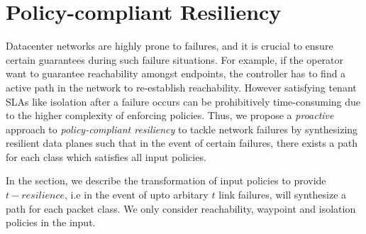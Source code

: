 \section{Policy-compliant Resiliency}
Datacenter networks are highly prone to failures, 
and it is crucial to ensure certain guarantees during such failure
situations. For example, if the operator want to guarantee
reachability amongst endpoints, the controller has to find a active
path in the network to re-establish reachability. However
satisfying tenant SLAs like isolation after a failure occurs
can be prohibitively time-consuming due to the higher complexity
of enforcing policies. 
Thus, we propose a \emph{proactive} approach 
to \emph{policy-compliant resiliency} to tackle network failures
by synthesizing resilient data planes such that in the event
of certain failures, there exists a path for each class which satisfies
all input policies. 

In the section, we describe the transformation of input 
policies to provide $t-resilience$, i.e in the event of upto arbitary
$t$ link failures, \name will synthesize a path for each
packet class. We only consider reachability, waypoint
and isolation policies in the input. 

